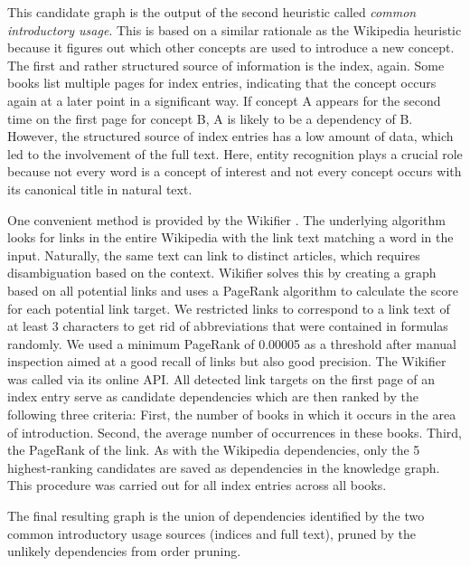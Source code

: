\documentclass{article}
\begin{document}
This candidate graph is the output of the second heuristic called \textit{common introductory usage}. This is based on a similar rationale as the Wikipedia heuristic because it figures out which other concepts are used to introduce a new concept. The first and rather structured source of information is the index, again. Some books list multiple pages for index entries, indicating that the concept occurs again at a later point in a significant way. If concept A appears for the second time on the first page for concept B, A is likely to be a dependency of B. However, the structured source of index entries has a low amount of data, which led to the involvement of the full text. Here, entity recognition plays a crucial role because not every word is a concept of interest and not every concept occurs with its canonical title in natural text.

One convenient method is provided by the Wikifier \citep{brank2017annotating}. The underlying algorithm looks for links in the entire Wikipedia with the link text matching a word in the input. Naturally, the same text can link to distinct articles, which requires disambiguation based on the context. Wikifier solves this by creating a graph based on all potential links and uses a PageRank algorithm to calculate the score for each potential link target. We restricted links to correspond to a link text of at least 3 characters to get rid of abbreviations that were contained in formulas randomly. We used a minimum PageRank of 0.00005 as a threshold after manual inspection aimed at a good recall of links but also good precision. The Wikifier was called via its online API. All detected link targets on the first page of an index entry serve as candidate dependencies which are then ranked by the following three criteria: First, the number of books in which it occurs in the area of introduction. Second, the average number of occurrences in these books. Third, the PageRank of the link. As with the Wikipedia dependencies, only the 5 highest-ranking candidates are saved as dependencies in the knowledge graph. This procedure was carried out for all index entries across all books.

The final resulting graph is the union of dependencies identified by the two common introductory usage sources (indices and full text), pruned by the unlikely dependencies from order pruning.
\end{document}
